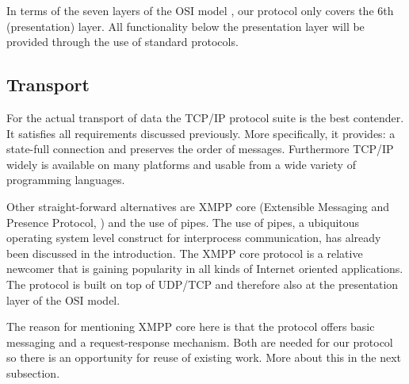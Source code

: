\documentclass{article}
\begin{document}
   In terms of the seven layers of the OSI model \cite{Day1983}, our protocol
   only covers the 6th (presentation) layer. All functionality below the
   presentation layer will be provided through the use of standard protocols.
   
  \subsection{Transport} \label{ss:transport}

   For the actual transport of data the TCP/IP protocol suite is the best
   contender. It satisfies all requirements discussed previously. More
   specifically, it provides: a state-full connection and preserves the order
   of messages.  Furthermore TCP/IP widely is available on many platforms and
   usable from a wide variety of programming languages.

   Other straight-forward alternatives are XMPP core (Extensible Messaging and
   Presence Protocol, \cite{rfc3920}) and the use of pipes. The use of pipes, a
   ubiquitous operating system level construct for interprocess communication,
   has already been discussed in the introduction. The XMPP core protocol is a
   relative newcomer that is gaining popularity in all kinds of Internet
   oriented applications. The protocol is built on top of UDP/TCP and therefore
   also at the presentation layer of the OSI model.
   
   The reason for mentioning XMPP core here is that the protocol offers basic
   messaging and a request-response mechanism. Both are needed for our protocol
   so there is an opportunity for reuse of existing work. More about this in
   the next subsection.
   

\end{document}
